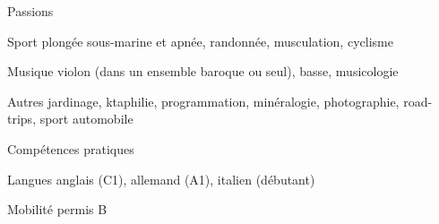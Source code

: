 \documentclass{LoLaTeXcv}
\begin{document}
\begin{lltxHistory}{Passions}
	\item[Sport] plongée sous-marine et apnée, randonnée, musculation, cyclisme
	\item[Musique] violon (dans un ensemble baroque ou seul), basse, musicologie
	\item[Autres] jardinage, ktaphilie, programmation, minéralogie, photographie, road-trips, sport automobile
\end{lltxHistory}

\begin{lltxHistory}{Compétences pratiques}
	\item[Langues] anglais (C1), allemand (A1), italien (débutant)
	\item[Mobilité] permis B
\end{lltxHistory}
\end{document}
